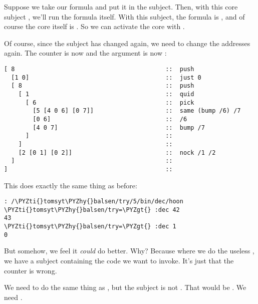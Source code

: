 Suppose we take our  formula and put it in the subject.  Then,
with this core subject , we'll run
the formula itself.  With this subject, the formula is , and
of course the core itself is .  So we can activate the core
with \kode{[2 [0 1] [0 2]]}.

Of course, since the subject has changed again, we need to change
the addresses again.  The counter is now  and the argument
is now :

\begin{framed_shaded}
\begin{Verbatim}[fontsize=\relsize{-2.5},fontseries=b,commandchars=\\\{\}]
[ 8                                          ::  push
  [1 0]                                      ::  just 0
  [ 8                                        ::  push
    [ 1                                      ::  quid
      [ 6                                    ::  pick
        [5 [4 0 6] [0 7]]                    ::  same (bump /6) /7
        [0 6]                                ::  /6
        [4 0 7]                              ::  bump /7
      ]                                      :: 
    ]                                        :: 
    [2 [0 1] [0 2]]                          ::  nock /1 /2
  ]                                          :: 
]                                            :: 
\end{Verbatim}
\end{framed_shaded}
This does exactly the same thing as before:

\begin{framed_shaded}
\begin{Verbatim}[fontsize=\relsize{-2.5},fontseries=b,commandchars=\\\{\}]
: /\PYZti{}tomsyt\PYZhy{}balsen/try/5/bin/dec/hoon
\PYZti{}tomsyt\PYZhy{}balsen/try=\PYZgt{} :dec 42
43
\PYZti{}tomsyt\PYZhy{}balsen/try=\PYZgt{} :dec 1
0
\end{Verbatim}
\end{framed_shaded}
But somehow, we feel it \emph{could} do better.  Why?  Because where
we do the useless \kode{[4 0 7]}, we have a subject containing the
code we want to invoke.  It's just that the counter is wrong.

We need to do the same thing as \kode{[2 [0 1] [0 2]}, but the subject
is not \kode{[0 1]}.  That would be .  We
need .

